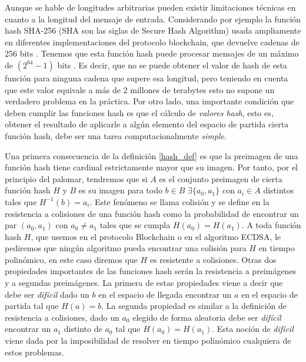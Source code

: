 Aunque se hable de longitudes arbitrarias pueden existir limitaciones técnicas en cuanto a la longitud del mensaje de entrada. Considerando por ejemplo la función hash SHA-256 (SHA son las siglas de Secure Hash Algorithm) usada ampliamente en diferentes implementaciones del protocolo blockchain, que devuelve cadenas de 256 bits \citep{sha256_2}. Tenemos que esta función hash puede procesar mensajes de un máximo de $(2^{64} -1)$ bits \citep{sha256}. Es decir, que no se puede obtener el valor de hash de esta función para ninguna cadena que supere esa longitud, pero teniendo en cuenta que este valor equivale a más de 2 millones de terabytes esto no supone un verdadero problema en la práctica.
Por otro lado, una importante condición que deben cumplir las funciones hash es que el cálculo de \textit{valores hash}, esto es, obtener el resultado de aplicarle a algún elemento del espacio de partida cierta función hash, debe ser una tarea computacionalmente \textit{simple}.

Una primera consecuencia de la definición \ref{hash_def} es que la preimagen de una función hash tiene cardinal estrictamente mayor que su imagen. Por tanto, por el principio del palomar, tendremos que si $A$ es el conjunto preimagen de cierta función hash $H$ y $B$ es su imagen para todo $b \in B$  $\exists \{a_{0},a_{1}\}$ con $a_{i} \in A$ distintos tales que $H^{-1}(b) = a_i$. Este fenómeno se llama colisión y se define en la resistencia a colisiones de una función hash como la probabilidad de encontrar un par $(a_{0},a_{1})$ con $a_{0} \not= a_{1}$ tales que se cumpla  $H(a_{0}) = H(a_{1})$. A toda función hash $H$, que usemos en el protocolo Blockchain o en el algoritmo ECDSA, le pediremos que ningún algoritmo pueda encontrar una colisión para $H$ en tiempo polinómico, en este caso diremos que $H$ es resistente a colisiones. Otras dos propiedades importantes de las funciones hash serán la resistencia a preimágenes y a segundas preimágenes. La primera de estas propiedades viene a decir que debe ser \textit{difícil} dado un $b$ en el espacio de llegada encontrar un $a$ en el espacio de partida tal que $H(a) = b$. La segunda propiedad es similar a la definición de resistencia a colisiones, dado un $a_{0}$ elegido de forma aleatoria debe ser \textit{difícil} encontrar un $a_{1}$ distinto de $a_{0}$ tal que $H(a_{0}) = H(a_{1})$. Esta noción de \textit{difícil} viene dada por la imposibilidad de resolver en tiempo polinómico cualquiera de estos problemas.

